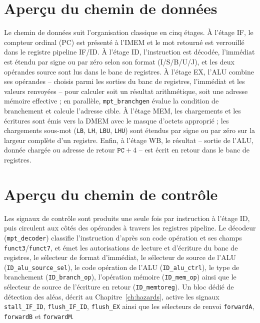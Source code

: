 \documentclass[11pt,a4paper,oneside]{report}
\begin{document}
\section{Aperçu du chemin de données}
Le chemin de données suit l'organisation classique en cinq
étages. À l'étage IF, le compteur ordinal (PC) est présenté à
l'IMEM et le mot retourné est verrouillé dans le registre
pipeline IF/ID. À l'étage ID, l'instruction est décodée,
l'immédiat est étendu par signe ou par zéro selon son format
(I/S/B/U/J), et les deux opérandes source sont lus dans le banc
de registres. À l'étage EX, l'ALU combine ses opérandes -- 
choisis parmi les sorties du banc de registres, l'immédiat et les
valeurs renvoyées -- pour calculer soit un résultat arithmétique,
soit une adresse mémoire effective ; en parallèle,
\texttt{mpt\_branchgen} évalue la condition de branchement et
calcule l'adresse cible. À l'étage MEM, les chargements et les
écritures sont émis vers la DMEM avec le masque d'octets
approprié ; les chargements sous-mot (\texttt{LB}, \texttt{LH},
\texttt{LBU}, \texttt{LHU}) sont étendus par signe ou par zéro
sur la largeur complète d'un registre. Enfin, à l'étage WB, le
résultat -- sortie de l'ALU, donnée chargée ou adresse de retour
$\texttt{PC}+4$ -- est écrit en retour dans le banc de registres.



\section{Aperçu du chemin de contrôle}
Les signaux de contrôle sont produits une seule fois par
instruction à l'étage ID, puis circulent aux côtés des opérandes
à travers les registres pipeline. Le décodeur
(\texttt{mpt\_decoder}) classifie l'instruction d'après son code
opération et ses champs \texttt{funct3}/\texttt{funct7}, et émet
les autorisations de lecture et d'écriture du banc de registres,
le sélecteur de format d'immédiat, le sélecteur de source de
l'ALU (\texttt{ID\_alu\_source\_sel}), le code opération de l'ALU
(\texttt{ID\_alu\_ctrl}), le type de branchement
(\texttt{ID\_branch\_op}), l'opération mémoire
(\texttt{ID\_mem\_op}) ainsi que le sélecteur de source de
l'écriture en retour (\texttt{ID\_memtoreg}). Un bloc dédié de
détection des aléas, décrit au Chapitre~\ref{ch:hazards}, active les
signaux \texttt{stall\_IF\_ID}, \texttt{flush\_IF\_ID},
\texttt{flush\_EX} ainsi que les sélecteurs de renvoi
\texttt{forwardA}, \texttt{forwardB} et \texttt{forwardM}.
\end{document}

